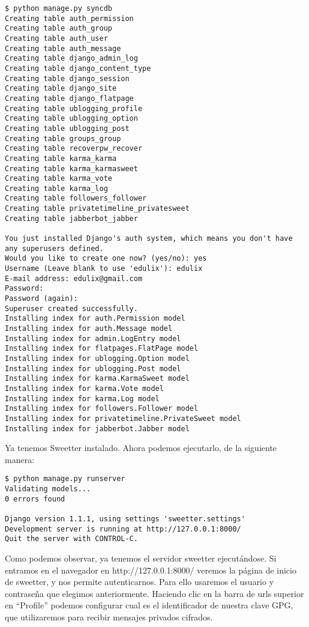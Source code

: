 \begin{verbatim}
$ python manage.py syncdb
Creating table auth_permission
Creating table auth_group
Creating table auth_user
Creating table auth_message
Creating table django_admin_log
Creating table django_content_type
Creating table django_session
Creating table django_site
Creating table django_flatpage
Creating table ublogging_profile
Creating table ublogging_option
Creating table ublogging_post
Creating table groups_group
Creating table recoverpw_recover
Creating table karma_karma
Creating table karma_karmasweet
Creating table karma_vote
Creating table karma_log
Creating table followers_follower
Creating table privatetimeline_privatesweet
Creating table jabberbot_jabber

You just installed Django's auth system, which means you don't have any superusers defined.
Would you like to create one now? (yes/no): yes
Username (Leave blank to use 'edulix'): edulix
E-mail address: edulix@gmail.com
Password: 
Password (again): 
Superuser created successfully.
Installing index for auth.Permission model
Installing index for auth.Message model
Installing index for admin.LogEntry model
Installing index for flatpages.FlatPage model
Installing index for ublogging.Option model
Installing index for ublogging.Post model
Installing index for karma.KarmaSweet model
Installing index for karma.Vote model
Installing index for karma.Log model
Installing index for followers.Follower model
Installing index for privatetimeline.PrivateSweet model
Installing index for jabberbot.Jabber model
\end{verbatim}

Ya tenemos Sweetter instalado. Ahora podemos ejecutarlo, de la siguiente manera:

\begin{verbatim}
$ python manage.py runserver
Validating models...
0 errors found

Django version 1.1.1, using settings 'sweetter.settings'
Development server is running at http://127.0.0.1:8000/
Quit the server with CONTROL-C.
\end{verbatim}

Como podemos observar, ya tenemos el servidor sweetter ejecutándose. Si entramos en el navegador en http://127.0.0.1:8000/ veremos la página de inicio de sweetter, y nos permite autenticarnos. Para ello usaremos el usuario y contraseña que elegimos anteriormente. Haciendo clic en la barra de urls superior en ``Profile'' podemos configurar cual es el identificador de nuestra clave GPG, que utilizaremos para recibir mensajes privados cifrados.

